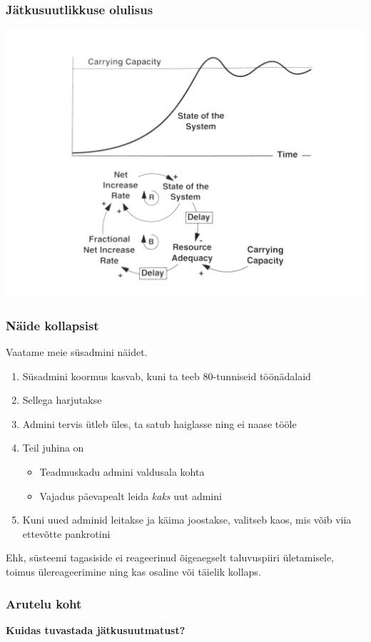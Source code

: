 \begin{frame}[fragile]
  \frametitle{Jätkusuutlikkuse olulisus}
  	\begin{center}
			\includegraphics[width=.75\textwidth]{over.png}
	\end{center}
	\cite{sterman2000business}
\end{frame}

\begin{frame}[fragile]
  \frametitle{Näide kollapsist}
	Vaatame meie süsadmini näidet. 

	\begin{enumerate}
		\item Süsadmini koormus kasvab, kuni ta teeb 80-tunniseid töönädalaid 
		\item Sellega harjutakse
		\item Admini tervis ütleb üles, ta satub haiglasse ning ei naase tööle
		\item Teil juhina on 
		\begin{itemize}
			\item Teadmuskadu admini valdusala kohta
			\item Vajadus päevapealt leida \emph{kaks} uut admini
		\end{itemize}
		\item Kuni uued adminid leitakse ja käima joostakse, valitseb kaos, mis võib viia ettevõtte pankrotini
	\end{enumerate}
	Ehk, süsteemi tagasiside ei reageerinud õigeaegselt taluvuspiiri ületamisele, toimus ülereageerimine ning kas osaline või täielik kollaps. 
\end{frame}


\begin{frame}[fragile]
  \frametitle{Arutelu koht}
		\begin{center}
			\textbf{Kuidas tuvastada jätkusuutmatust?}
		\end{center}
\end{frame}


